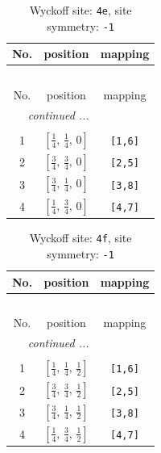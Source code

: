 \documentclass[fleqn,8pt]{jsarticle}
\begin{document}
\begin{longtable}{ccc}
\caption{Wyckoff site: {\tt 4e}, site symmetry: {\tt -1}}
 \\
 \hline \hline
No. & position & mapping \\ \hline \endfirsthead

\multicolumn{2}{l}{\tablename\ \thetable{}} \\
 \hline \hline
No. & position & mapping \\ \hline \endhead

 \hline \hline
\multicolumn{2}{r}{\footnotesize\it continued ...} \\ \endfoot

 \hline \hline
\multicolumn{2}{r}{} \\ \endlastfoot

1 & $\left[ \frac{1}{4},\, \frac{1}{4},\, 0 \right]$ & {\tt [1,6]} \\ \hline
2 & $\left[ \frac{3}{4},\, \frac{3}{4},\, 0 \right]$ & {\tt [2,5]} \\ \hline
3 & $\left[ \frac{3}{4},\, \frac{1}{4},\, 0 \right]$ & {\tt [3,8]} \\ \hline
4 & $\left[ \frac{1}{4},\, \frac{3}{4},\, 0 \right]$ & {\tt [4,7]} \\
\end{longtable}
\renewcommand{\arraystretch}{1.2}
\begin{longtable}{ccc}
\caption{Wyckoff site: {\tt 4f}, site symmetry: {\tt -1}}
 \\
 \hline \hline
No. & position & mapping \\ \hline \endfirsthead

\multicolumn{2}{l}{\tablename\ \thetable{}} \\
 \hline \hline
No. & position & mapping \\ \hline \endhead

 \hline \hline
\multicolumn{2}{r}{\footnotesize\it continued ...} \\ \endfoot

 \hline \hline
\multicolumn{2}{r}{} \\ \endlastfoot

1 & $\left[ \frac{1}{4},\, \frac{1}{4},\, \frac{1}{2} \right]$ & {\tt [1,6]} \\ \hline
2 & $\left[ \frac{3}{4},\, \frac{3}{4},\, \frac{1}{2} \right]$ & {\tt [2,5]} \\ \hline
3 & $\left[ \frac{3}{4},\, \frac{1}{4},\, \frac{1}{2} \right]$ & {\tt [3,8]} \\ \hline
4 & $\left[ \frac{1}{4},\, \frac{3}{4},\, \frac{1}{2} \right]$ & {\tt [4,7]} \\
\end{longtable}
\end{document}
